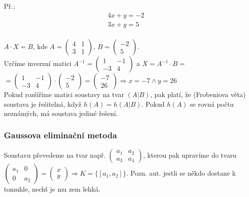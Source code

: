 \documentclass[12pt, a4paper]{article}
\newcommand{\imply}{\Rightarrow}
\begin{document}
Př.:\\
\[
 \begin{aligned}
4x + y = -2\\
3x + y = 5
\end{aligned}\]\\

$A \cdot X = B$, kde $A= \begin{pmatrix} 4 & 1 \\ 3 & 1  \end{pmatrix}$, $B= \begin{pmatrix} -2 \\ 5 \end{pmatrix}$.\\
Určíme inverzní matici $A^{-1}= \begin{pmatrix} 1 & -1 \\ -3 & 4  \end{pmatrix}$ a $X = A^{-1} \cdot B =$\\
$= \begin{pmatrix} 1 & -1 \\ -3 & 4  \end{pmatrix} \cdot \begin{pmatrix} -2 \\ 5 \end{pmatrix} = \begin{pmatrix} -7 \\ 26 \end{pmatrix} \imply x = -7 \land y = 26$\\

Pokud rozšíříme matici soustavy na tvar $(A|B)$, pak platí, že (Frobeniova věta) soustava je řešitelná, když $h(A)=h(A|B)$. Pokud $h(A)$ se rovná počtu neznámých, má soustava jediné řešení.

\subsubsection*{Gaussova eliminační metoda}
Soustavu převedeme na tvar např. $\begin{pmatrix} a_1 & a_2 \\ a_3 & a_4 \end{pmatrix}$, kterou pak upravíme do tvaru $\begin{pmatrix} a_1 & 0\\ 0 & a_2 \end{pmatrix} = \begin{pmatrix} x \\ y \end{pmatrix} \imply K=\{[a_1,a_2]\}$. Pozn. aut. jestli se někdo dostane k tomuhle, nechť je mu zem lehká.
\end{document}
